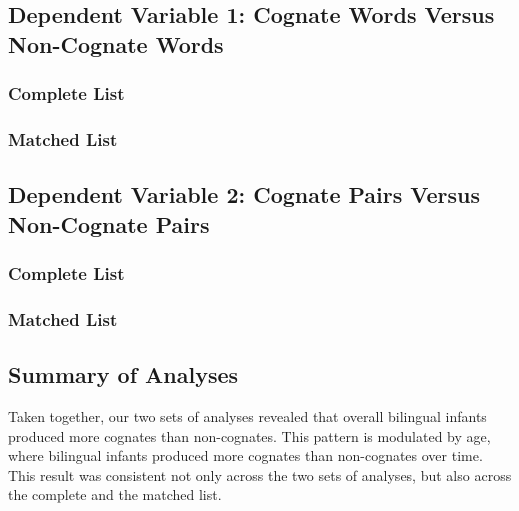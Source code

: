 \documentclass[
  english,
  ,man,floatsintext]{apa6}
\begin{document}
\hypertarget{dependent-variable-1-cognate-words-versus-non-cognate-words}{%
\subsection{Dependent Variable 1: Cognate Words Versus Non-Cognate Words}\label{dependent-variable-1-cognate-words-versus-non-cognate-words}}

\hypertarget{complete-list}{%
\subsubsection{Complete List}\label{complete-list}}

\hypertarget{matched-list}{%
\subsubsection{Matched List}\label{matched-list}}

\hypertarget{dependent-variable-2-cognate-pairs-versus-non-cognate-pairs}{%
\subsection{Dependent Variable 2: Cognate Pairs Versus Non-Cognate Pairs}\label{dependent-variable-2-cognate-pairs-versus-non-cognate-pairs}}

\hypertarget{complete-list-1}{%
\subsubsection{Complete List}\label{complete-list-1}}

\hypertarget{matched-list-1}{%
\subsubsection{Matched List}\label{matched-list-1}}

\hypertarget{summary-of-analyses}{%
\subsection{Summary of Analyses}\label{summary-of-analyses}}

Taken together, our two sets of analyses revealed that overall bilingual infants produced more cognates than non-cognates. This pattern is modulated by age, where bilingual infants produced more cognates than non-cognates over time. This result was consistent not only across the two sets of analyses, but also across the complete and the matched list.
\end{document}
